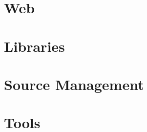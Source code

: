\documentclass[a4paper,10pt,twoside]{book}
\begin{document}



\part{Web}


\part{Libraries}
 


%




\part{Source Management}

%





\part{Tools}








\printindex
\end{document}

